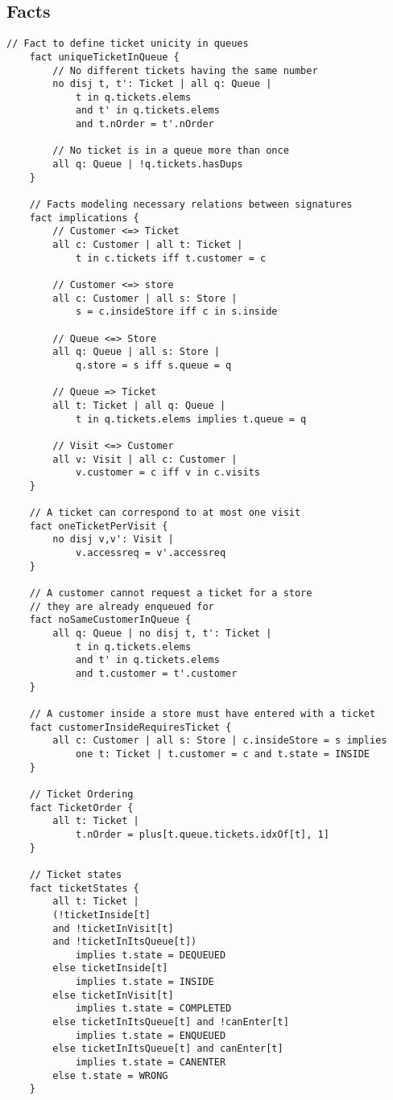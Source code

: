 
\subsection{Facts}

\begin{lstlisting}[language=alloy]
	// Fact to define ticket unicity in queues
	fact uniqueTicketInQueue {
		// No different tickets having the same number
		no disj t, t': Ticket | all q: Queue |
			t in q.tickets.elems 
			and t' in q.tickets.elems
			and t.nOrder = t'.nOrder
		
		// No ticket is in a queue more than once
		all q: Queue | !q.tickets.hasDups
	}
	
	// Facts modeling necessary relations between signatures
	fact implications {
		// Customer <=> Ticket
		all c: Customer | all t: Ticket | 
			t in c.tickets iff t.customer = c
		
		// Customer <=> store
		all c: Customer | all s: Store | 
			s = c.insideStore iff c in s.inside
		
		// Queue <=> Store
		all q: Queue | all s: Store | 
			q.store = s iff s.queue = q
		
		// Queue => Ticket
		all t: Ticket | all q: Queue | 
			t in q.tickets.elems implies t.queue = q
		
		// Visit <=> Customer
		all v: Visit | all c: Customer |
			v.customer = c iff v in c.visits
	}

	// A ticket can correspond to at most one visit
	fact oneTicketPerVisit {
		no disj v,v': Visit | 
			v.accessreq = v'.accessreq
	}
	
	// A customer cannot request a ticket for a store 
	// they are already enqueued for
	fact noSameCustomerInQueue {
		all q: Queue | no disj t, t': Ticket |  
			t in q.tickets.elems 
			and t' in q.tickets.elems 
			and t.customer = t'.customer 
	}
	
	// A customer inside a store must have entered with a ticket
	fact customerInsideRequiresTicket {
		all c: Customer | all s: Store | c.insideStore = s implies 
			one t: Ticket | t.customer = c and t.state = INSIDE
	}
	
	// Ticket Ordering
	fact TicketOrder {
		all t: Ticket |
			t.nOrder = plus[t.queue.tickets.idxOf[t], 1]
	}
	
	// Ticket states
	fact ticketStates {
		all t: Ticket |  
		(!ticketInside[t] 
		and !ticketInVisit[t] 
		and !ticketInItsQueue[t]) 
			implies t.state = DEQUEUED
		else ticketInside[t] 
			implies t.state = INSIDE
		else ticketInVisit[t] 
			implies t.state = COMPLETED
		else ticketInItsQueue[t] and !canEnter[t] 
			implies t.state = ENQUEUED
		else ticketInItsQueue[t] and canEnter[t] 
			implies t.state = CANENTER
		else t.state = WRONG
	}
	

\end{lstlisting}
